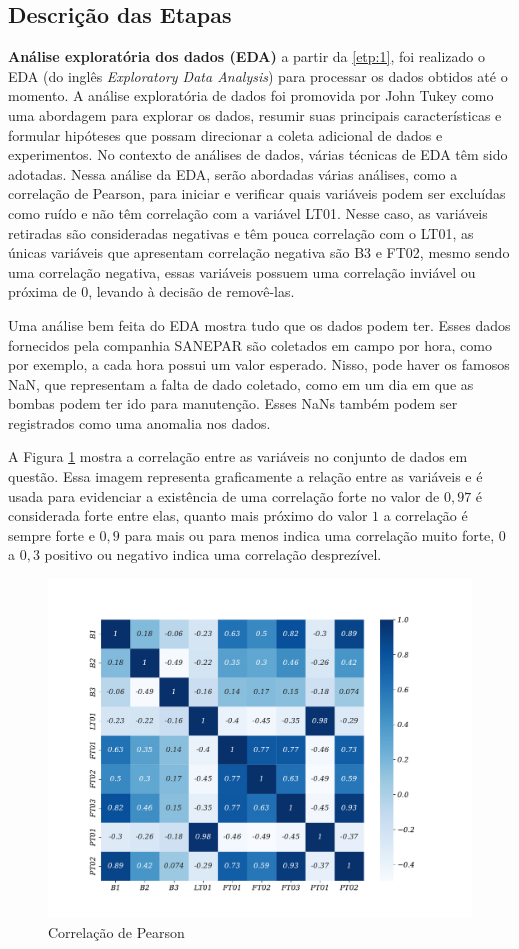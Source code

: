 \subsection{Descri\c c\~ao das Etapas}

\textbf{An\'alise explorat\'oria dos dados (EDA)}
a partir da \ref{etp:1}, foi realizado o EDA (do inglês \textit{Exploratory Data Analysis}) para processar os dados obtidos até o momento. A análise exploratória de dados foi promovida por John Tukey \cite{Bandara2021} como uma abordagem para explorar os dados, resumir suas principais características e formular hipóteses que possam direcionar a coleta adicional de dados e experimentos. No contexto de análises de dados, várias técnicas de EDA têm sido adotadas.
Nessa análise da EDA, serão abordadas várias análises, como a correlação de Pearson, para iniciar e verificar quais variáveis podem ser excluídas como ruído e não têm correlação com a variável LT01. Nesse caso, as variáveis retiradas são consideradas negativas e têm pouca correlação com o LT01, as únicas variáveis que apresentam correlação negativa são B3 e FT02, mesmo sendo uma correlação negativa, essas variáveis possuem uma correlação inviável ou próxima de $0$, levando à decisão de removê-las.

Uma análise bem feita do EDA mostra tudo que os dados podem ter. Esses dados fornecidos pela companhia SANEPAR são coletados em campo por hora, como por exemplo, a cada hora possui um valor esperado. Nisso, pode haver os famosos NaN, que representam a falta de dado coletado, como em um dia em que as bombas podem ter ido para manutenção. Esses NaNs também podem ser registrados como uma anomalia nos dados.

A Figura \ref{fig:person} mostra a correlação entre as variáveis no conjunto de dados em questão. Essa imagem representa graficamente a relação entre as variáveis e é usada para evidenciar a existência de uma correlação forte no valor de $0,97$ é considerada forte entre elas, quanto mais próximo do valor $1$ a correlação é sempre forte e $0,9$ para mais ou para menos indica uma correlação muito forte, 0 a $0,3$ positivo ou negativo indica uma correlação desprezível.

\begin{figure}[!htb]
	\centering
	\caption{Correlação de Pearson}
	\label{fig:person}
	\includegraphics[width=0.7\linewidth]{Apendices/Figuras/modelagem-24h/person}
	
	
\end{figure}

